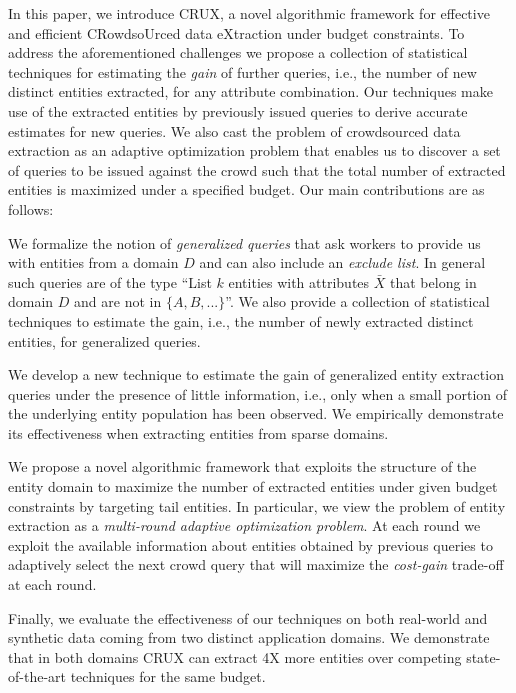 In this paper, we introduce CRUX, a novel algorithmic framework for effective and efficient CRowdsoUrced data eXtraction under budget constraints. To address the aforementioned challenges we propose a collection of  statistical techniques for estimating the {\em gain} of further queries, i.e., the number of new distinct entities extracted, for any attribute combination. Our techniques make use of the extracted entities by previously issued queries to derive accurate estimates for new queries. We also cast the problem of crowdsourced data extraction as an adaptive optimization problem that enables us to discover a set of queries to be issued against the crowd such that the total number of extracted entities is maximized under a specified budget. Our main contributions are as follows:
\squishlist
\item We formalize the notion of {\em generalized queries} that ask workers to provide us with entities from a domain $D$ and can also include an {\em exclude list}. In general such queries are of the type ``List $k$ entities with attributes $\bar{X}$ that belong in domain $D$ and are not in $\{A, B, ...\}$''.  We also provide a collection of statistical techniques to estimate the gain, i.e., the number of newly extracted distinct entities, for generalized queries. 
\item We develop a new technique to estimate the gain of generalized entity extraction queries under the presence of little information, i.e., only when a small portion of the underlying entity population has been observed. We empirically demonstrate its effectiveness when extracting entities from sparse domains.
\item We propose a novel algorithmic framework that exploits the structure of the entity domain to maximize the number of extracted entities under given budget constraints by targeting tail entities. In particular, we view the problem of entity extraction as a {\em multi-round adaptive optimization problem}. At  each round we exploit the available information about entities obtained by previous queries to adaptively select the next crowd query that will maximize the {\em cost-gain} trade-off at each round. 
\item Finally, we evaluate the effectiveness of our techniques on both real-world and synthetic data coming from two distinct application domains. We demonstrate that in both domains CRUX can extract 4X more entities over competing state-of-the-art techniques for the same budget.
\squishend


